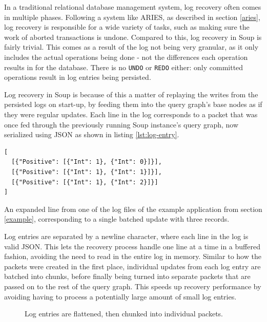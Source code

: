 \documentclass[b5paper]{report}
\begin{document}
In a traditional relational database management system, log recovery often comes
in multiple phases. Following a system like ARIES, as described in section
\ref{aries}, log recovery is responsible for a wide variety of tasks, such as
making sure the work of aborted transactions is undone. Compared to this, log
recovery in Soup is fairly trivial. This comes as a result of the log not being
very granular, as it only includes the actual operations being done - not the
differences each operation results in for the database. There is no
\texttt{UNDO} or \texttt{REDO} either: only committed operations result in log
entries being persisted.

Log recovery in Soup is because of this a matter of replaying the writes from
the persisted logs on start-up, by feeding them into the query graph's base
nodes as if they were regular updates. Each line in the log corresponds to a
packet that was once fed through the previously running Soup instance's query
graph, now serialized using JSON as shown in listing \ref{lst:log-entry}.

\begin{listing}[H]
  \begin{verbatim}
[
  [{"Positive": [{"Int": 1}, {"Int": 0}]}],
  [{"Positive": [{"Int": 1}, {"Int": 1}]}],
  [{"Positive": [{"Int": 1}, {"Int": 2}]}]
]
  \end{verbatim}
  \caption{
    An expanded line from one of the log files of the example application from section
    \ref{example}, corresponding to a single batched update with three records.
    \label{lst:log-entry}
  }
\end{listing}

Log entries are separated by a newline character, where each line in the log
is valid JSON. This lets the recovery process handle one line at a time in a
buffered fashion, avoiding the need to read in the entire log in memory. Similar
to how the packets were created in the first place, individual updates from
each log entry are batched into chunks, before finally being turned into
separate packets that are passed on to the rest of the query graph. This speeds
up recovery performance by avoiding having to process a potentially large
amount of small log entries.

\begin{figure}[H]
  
  \caption{
    Log entries are flattened, then chunked into individual packets.
    \label{log-chunking}
  }
\end{figure}
\end{document}
